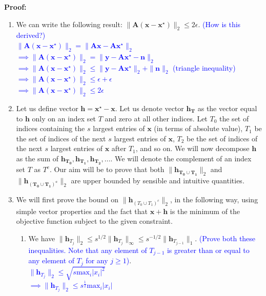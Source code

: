 \documentclass[11pt]{article}
\begin{document}
\begin{enumerate}
\textbf{Proof:}
\\
\begin{enumerate}
\item We can write the following result: $\|\mathbf{A(x-x^{\star})}\|_2 \leq 2\epsilon$. \textcolor{blue}{(How is this derived?)}\\
\textcolor{blue}{$\|\mathbf{A(x-x^{\star})}\|_2 = \|\mathbf{Ax-Ax^{\star}}\|_2$\\
$\implies \|\mathbf{A(x-x^{\star})}\|_2 = \|\mathbf{y-Ax^{\star}-n}\|_2$\\
$\implies \|\mathbf{A(x-x^{\star})}\|_2 \leq \|\mathbf{y-Ax^{\star}}\|_2 + \|\mathbf{n}\|_2$ (triangle inequality)\\
$\implies \|\mathbf{A(x-x^{\star})}\|_2 \leq \epsilon + \epsilon$\\
$\implies \|\mathbf{A(x-x^{\star})}\|_2 \leq 2\epsilon$}
\item Let us define vector $\mathbf{h} = \mathbf{x^{\star}-x}$. Let us denote vector $\mathbf{h_T}$ as the vector equal to $\mathbf{h}$ only on an index set $T$ and zero at all other indices. Let $T_0$ the set of indices containing the $s$ largest entries of $\mathbf{x}$ (in terms of absolute value), $T_1$ be the set of indices of the next $s$ largest entries of $\mathbf{x}$, $T_2$ be the set of indices of the next $s$ largest entries of $\mathbf{x}$ after $T_1$, and so on. We will now decompose $\mathbf{h}$ as the sum of $\mathbf{h_{T_0}}, \mathbf{h_{T_1}}, \mathbf{h_{T_2}}, ...$. We will denote the complement of an index set $T$ as $T^c$. Our aim will be to prove that both $\|\mathbf{h_{T_0 \cup T_1}}\|_2$ and $\|\mathbf{h_{(T_0 \cup T_1)^c}}\|_2$ are upper bounded by sensible and intuitive quantities. 
\item We will first prove the bound on $\|\mathbf{h}_{(T_0 \cup T_1)^c}\|_2$, in the following way, using simple vector properties and the fact that $\mathbf{x+h}$ is the minimum of the objective function subject to the given constraint. 
\begin{enumerate}
\item We have $\|\mathbf{h}_{T_j}\|_2 \leq s^{1/2} \|\mathbf{h}_{T_j}\|_\infty \leq s^{-1/2} \|\mathbf{h}_{T_{j-1}}\|_1$. \textcolor{blue}{(Prove both these inequalities. Note that any element of $T_{j-1}$ is greater than or equal to any element of $T_j$ for any $j \geq 1$)}.\\
\textcolor{blue}{$\|\mathbf{h}_{T_j}\|_2 \leq \sqrt{s\textrm{max}_i |x_i|^2} $ \\
$\implies \|\mathbf{h}_{T_j}\|_2 \leq s^\frac{1}{2}\textrm{max}_i |x_i|$\\
}
\end{enumerate}
\end{enumerate}
\end{enumerate}
\end{document}
